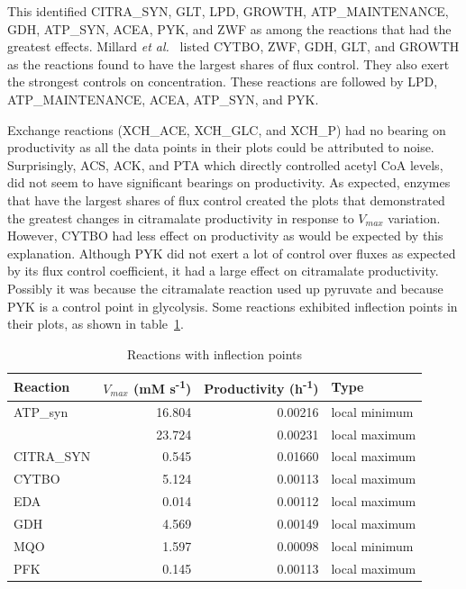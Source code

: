 \documentclass[parskip=full, numbers=noenddot]{scrreprt}
\begin{document}
This identified CITRA\_SYN, GLT, LPD, GROWTH, ATP\_MAINTENANCE, GDH, ATP\_SYN, ACEA, PYK, and ZWF as among the reactions that had the greatest effects. Millard \emph{et al.}~\cite{millard_metabolic_2017} listed CYTBO, ZWF, GDH, GLT, and GROWTH as the reactions found to have the largest shares of flux control. They also exert the strongest controls on concentration. These reactions are followed by LPD, ATP\_MAINTENANCE, ACEA, ATP\_SYN, and PYK.

Exchange reactions (XCH\_ACE, XCH\_GLC, and XCH\_P) had no bearing on productivity as all the data points in their plots could be attributed to noise. Surprisingly, ACS, ACK, and PTA which directly controlled acetyl CoA levels, did not seem to have significant bearings on productivity. As expected, enzymes that have the largest shares of flux control created the plots that demonstrated the greatest changes in citramalate productivity in response to $V_{max}$ variation. However, CYTBO had less effect on productivity as would be expected by this explanation. Although PYK did not exert a lot of control over fluxes as expected by its flux control coefficient, it had a large effect on citramalate productivity. Possibly it was because the citramalate reaction used up pyruvate and because PYK is a control point in glycolysis. Some reactions exhibited inflection points in their plots, as shown in table~\ref{tab:inflection}.

\begin{table}[h]
  \caption{Reactions with inflection points}
  \label{tab:inflection}
  \centering
  \begin{tabular}{lrrl}
    \toprule
    Reaction & $V_{max}$ (mM s\textsuperscript{-1}) & Productivity (h\textsuperscript{-1}) & Type\\
    \midrule
    ATP\_syn & 16.804 & 0.00216 & local minimum\\
    & 23.724 & 0.00231 & local maximum\\
    CITRA\_SYN & 0.545 & 0.01660 & local maximum\\
    CYTBO & 5.124 & 0.00113 & local maximum\\
    EDA & 0.014 & 0.00112 & local maximum\\
    GDH & 4.569 & 0.00149 & local maximum\\
    MQO & 1.597 & 0.00098 & local minimum\\
    PFK & 0.145 & 0.00113 & local maximum\\
    \bottomrule
  \end{tabular}
\end{table}
\end{document}
